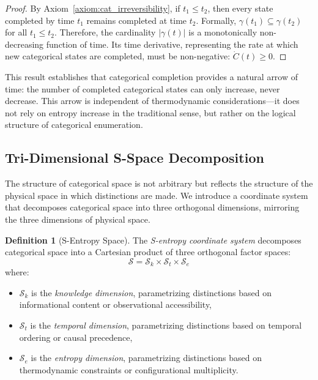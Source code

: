 \documentclass[12pt,a4paper]{article}
\theoremstyle{definition}
\newtheorem{definition}[theorem]{Definition}
\theoremstyle{remark}
\newcommand{\Sentropy}{\mathcal{S}}
\begin{document}
\begin{proof}
By Axiom~\ref{axiom:cat_irreversibility}, if $t_1 \leq t_2$, then every state completed by time $t_1$ remains completed at time $t_2$. Formally, $\gamma(t_1) \subseteq \gamma(t_2)$ for all $t_1 \leq t_2$. Therefore, the cardinality $|\gamma(t)|$ is a monotonically non-decreasing function of time. Its time derivative, representing the rate at which new categorical states are completed, must be non-negative: $\dot{C}(t) \geq 0$.
\end{proof}

This result establishes that categorical completion provides a natural arrow of time: the number of completed categorical states can only increase, never decrease. This arrow is independent of thermodynamic considerations—it does not rely on entropy increase in the traditional sense, but rather on the logical structure of categorical enumeration.

\subsection{Tri-Dimensional S-Space Decomposition}

The structure of categorical space is not arbitrary but reflects the structure of the physical space in which distinctions are made. We introduce a coordinate system that decomposes categorical space into three orthogonal dimensions, mirroring the three dimensions of physical space.

\begin{definition}[S-Entropy Space]
\label{def:s_space}
The \emph{S-entropy coordinate system} decomposes categorical space into a Cartesian product of three orthogonal factor spaces:
\begin{equation}
\Sentropy = \Sentropy_k \times \Sentropy_t \times \Sentropy_e
\end{equation}
where:
\begin{itemize}
    \item $\Sentropy_k$ is the \emph{knowledge dimension}, parametrizing distinctions based on informational content or observational accessibility,
    \item $\Sentropy_t$ is the \emph{temporal dimension}, parametrizing distinctions based on temporal ordering or causal precedence,
    \item $\Sentropy_e$ is the \emph{entropy dimension}, parametrizing distinctions based on thermodynamic constraints or configurational multiplicity.
\end{itemize}
\end{definition}
\end{document}
